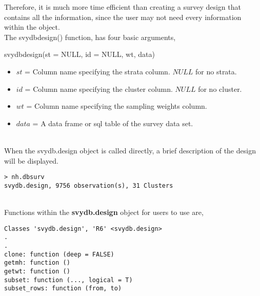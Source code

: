 Therefore, it is much more time efficient than creating a survey design that contains all the information, since the user may not need every information within the object. \\



The {\ttfamily svydbdesign()} function, has four basic arguments,
\begin{center}
    {\ttfamily svydbdesign(st = NULL, id = NULL, wt, data)}
\end{center}

\begin{itemize}
\item $st$ = Column name specifying the strata column. $NULL$ for no strata. 

\item $id$ = Column name specifying the cluster column. $NULL$ for no cluster. 

\item $wt$ = Column name specifying the sampling weights column.

\item $data$ = A data frame or sql table of the survey data set.
\end{itemize}

\\

When the {\ttfamily svydb.design} object is called directly, a brief description of the design will be displayed.

\begin{lstlisting}
> nh.dbsurv
svydb.design, 9756 observation(s), 31 Clusters
\end{lstlisting}

\\

Functions within the {\bf svydb.design} object for users to use are,

\begin{lstlisting}
Classes 'svydb.design', 'R6' <svydb.design>
.
.
clone: function (deep = FALSE) 
getmh: function () 
getwt: function () 
subset: function (..., logical = T) 
subset_rows: function (from, to) 
\end{lstlisting}


